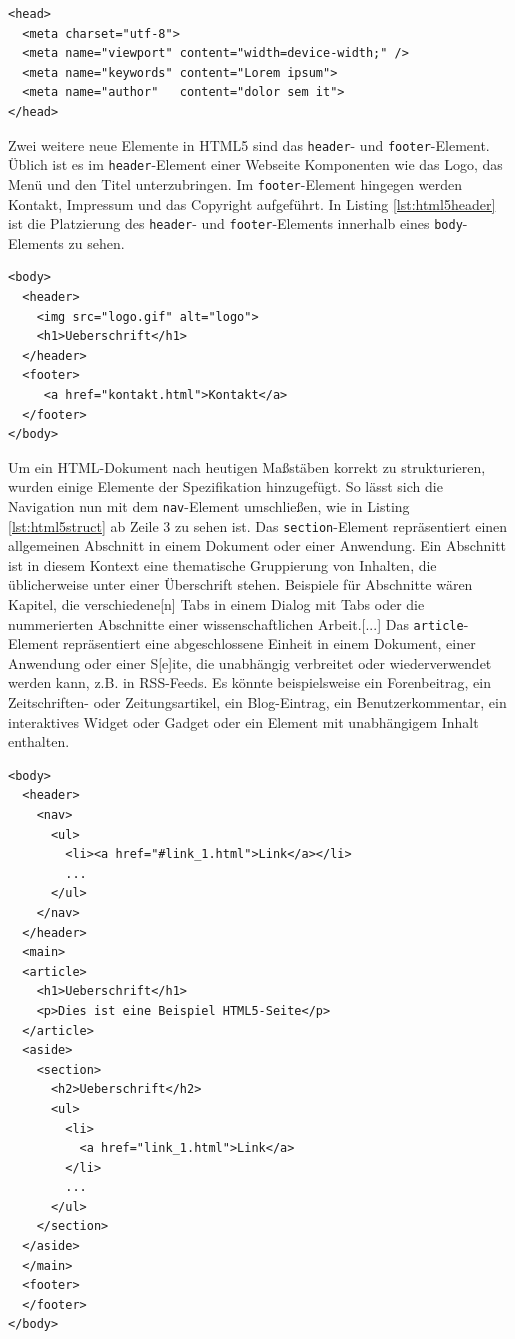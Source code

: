 \vspace{1em}
\begin{lstlisting}[language=HTML5, caption=HTML5 \texttt{meta}-Element, label=lst:html5meta]
<head>
  <meta charset="utf-8">
  <meta name="viewport" content="width=device-width;" />
  <meta name="keywords" content="Lorem ipsum">
  <meta name="author"   content="dolor sem it">
</head>
\end{lstlisting}
		
Zwei weitere neue Elemente in HTML5 sind das \texttt{header}- und \texttt{footer}-Element. Üblich ist es im \texttt{header}-Element einer Webseite Komponenten wie das Logo, das Menü und den Titel unterzubringen. Im \texttt{footer}-Element hingegen werden Kontakt, Impressum und das Copyright aufgeführt. In Listing \ref{lst:html5header} ist die Platzierung des \texttt{header}- und \texttt{footer}-Elements innerhalb eines \texttt{body}-Elements zu sehen.

\vspace{1em}
\begin{lstlisting}[language=HTML5, caption=HTML5 \texttt{header}- und \texttt{footer}-Element, label=lst:html5header]
<body>
  <header>
    <img src="logo.gif" alt="logo">
    <h1>Ueberschrift</h1>
  </header>
  <footer>
     <a href="kontakt.html">Kontakt</a>
  </footer>
</body>
\end{lstlisting}
	
Um ein HTML-Dokument nach heutigen Maßstäben korrekt zu strukturieren, wurden einige Elemente der Spezifikation hinzugefügt. So lässt sich die Navigation nun mit dem \texttt{nav}-Element umschließen, wie in Listing \ref{lst:html5struct} ab Zeile 3 zu sehen ist. \glqq Das \texttt{section}-Element repräsentiert einen allgemeinen Abschnitt in einem Dokument oder einer Anwendung. Ein Abschnitt ist in diesem Kontext eine thematische Gruppierung von Inhalten, die üblicherweise unter einer Überschrift stehen. Beispiele für Abschnitte wären Kapitel, die verschiedene[n] Tabs in einem Dialog mit Tabs oder die nummerierten Abschnitte einer wissenschaftlichen Arbeit.[...] Das \texttt{article}-Element repräsentiert eine abgeschlossene Einheit in einem Dokument, einer Anwendung oder einer S[e]ite, die unabhängig verbreitet oder wiederverwendet werden kann, z.B. in RSS-Feeds. Es könnte beispielsweise ein Forenbeitrag, ein Zeitschriften- oder Zeitungsartikel, ein Blog-Eintrag, ein Benutzerkommentar, ein interaktives Widget oder Gadget oder ein Element mit unabhängigem Inhalt enthalten.

\vspace{1em}
\begin{lstlisting}[language=HTML5, caption=HTML5 Struktur Elemente, label=lst:html5struct]
<body>
  <header>
    <nav>
      <ul>
        <li><a href="#link_1.html">Link</a></li>
        ...
      </ul>
    </nav>
  </header>
  <main>
  <article>
    <h1>Ueberschrift</h1>
    <p>Dies ist eine Beispiel HTML5-Seite</p>
  </article>
  <aside>
    <section>
      <h2>Ueberschrift</h2>
      <ul>
        <li>
          <a href="link_1.html">Link</a>
        </li>
        ...
      </ul>
    </section>
  </aside>
  </main>
  <footer>
  </footer>
</body>
\end{lstlisting}
	
